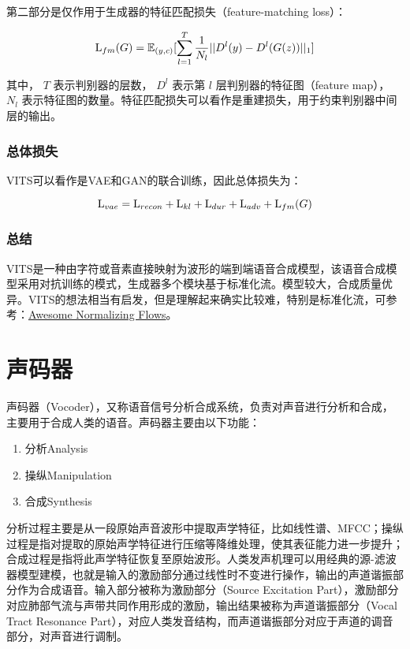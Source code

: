 \documentclass[cn,10pt,math=newtx,citestyle=gb7714-2015,bibstyle=gb7714-2015]{elegantbook}
\begin{document}
第二部分是仅作用于生成器的特征匹配损失（feature-matching loss）：

\begin{equation}
  {\rm L}_{fm}(G)=\mathbb{E}_{(y,c)}[\sum_{l=1}^T\frac{1}{N_l}||D^l(y)-D^l(G(z))||_1]
\end{equation}

其中， $T$ 表示判别器的层数， $D^l$ 表示第 $l$ 层判别器的特征图（feature map）， $N_l$ 表示特征图的数量。特征匹配损失可以看作是重建损失，用于约束判别器中间层的输出。

\subsection{总体损失}

VITS可以看作是VAE和GAN的联合训练，因此总体损失为：

\begin{equation}
  {\rm L}_{vae}={\rm L}_{recon}+{\rm L}_{kl}+{\rm L}_{dur}+{\rm L}_{adv}+{\rm L}_{fm}(G)
\end{equation}

\subsection{总结}

VITS是一种由字符或音素直接映射为波形的端到端语音合成模型，该语音合成模型采用对抗训练的模式，生成器多个模块基于标准化流。模型较大，合成质量优异。VITS的想法相当有启发，但是理解起来确实比较难，特别是标准化流，可参考：\href{https://github.com/janosh/awesome-normalizing-flows}{Awesome Normalizing Flows}。




\chapter{声码器}

声码器（Vocoder），又称语音信号分析合成系统，负责对声音进行分析和合成，主要用于合成人类的语音。声码器主要由以下功能：

\begin{enumerate}
  \item 分析Analysis
  \item 操纵Manipulation
  \item 合成Synthesis
\end{enumerate}

分析过程主要是从一段原始声音波形中提取声学特征，比如线性谱、MFCC；操纵过程是指对提取的原始声学特征进行压缩等降维处理，使其表征能力进一步提升；合成过程是指将此声学特征恢复至原始波形。人类发声机理可以用经典的源-滤波器模型建模，也就是输入的激励部分通过线性时不变进行操作，输出的声道谐振部分作为合成语音。输入部分被称为激励部分（Source Excitation Part），激励部分对应肺部气流与声带共同作用形成的激励，输出结果被称为声道谐振部分（Vocal Tract Resonance Part），对应人类发音结构，而声道谐振部分对应于声道的调音部分，对声音进行调制。
\end{document}
